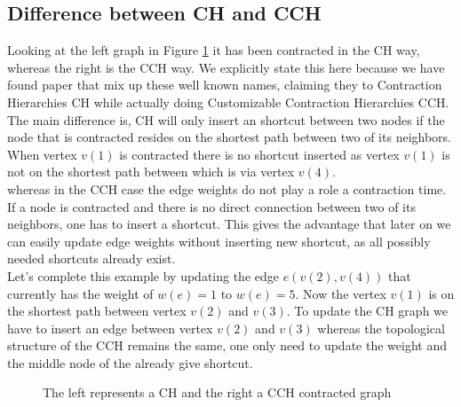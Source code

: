\subsection{Difference between CH and CCH}

Looking at the left graph in Figure \ref*{fig:DifferenceCHAndCCH} it has been contracted in the CH way, whereas the right is the CCH way. We explicitly state this here because 
we have found paper \cite{Ouyang_2020} that mix up these well known names, claiming they to Contraction Hierarchies CH while actually doing Customizable Contraction Hierarchies CCH. 
The main difference is, CH will only insert an shortcut between two nodes if the node that is contracted resides on the shortest path between two of its neighbors. 
When vertex $v(1)$ is contracted there is no shortcut inserted as vertex $v(1)$ is not on the shortest path between which is via vertex $v(4)$.
\\
whereas in the CCH case the edge weights do not play a role a contraction time. If a node is contracted and there is no direct connection between two of its neighbors, one has to insert a shortcut. This gives
the advantage that later on we can easily update edge weights without inserting new shortcut, as all possibly needed shortcuts already exist.
\\ 
Let's complete this example by updating the edge $e(v(2), v(4))$ that currently has the weight of $w(e)=1$ to $w(e) = 5$. Now the vertex $v(1)$ is on the shortest path between vertex $v(2)$ and $v(3)$. 
To update the CH graph we have to insert an edge between vertex $v(2)$ and $v(3)$ whereas the topological structure of the CCH remains the same, one only need to update the weight and the middle node of the already give shortcut.

\begin{figure}
    \centering
    
    \caption{The left represents a CH and the right a CCH contracted graph}
    \label{fig:DifferenceCHAndCCH}
\end{figure}

